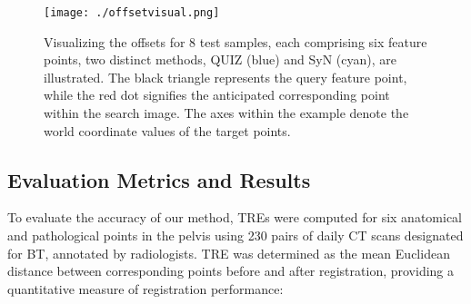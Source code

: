 \documentclass[preprint,review,12pt]{elsarticle}
\begin{document}
\begin{figure*}[!h]
    \centering
    \texttt{[image: ./offsetvisual.png]}
    \caption{Visualizing the offsets for 8 test samples, each comprising six feature points, two distinct methods, QUIZ (blue) and SyN (cyan), are illustrated. The black triangle represents the query feature point, while the red dot signifies the anticipated corresponding point within the search image. The axes within the example denote the world coordinate values of the target points.}
    \label{fig:plteps}
\end{figure*}

\begin{table*}
	\setlength{\abovecaptionskip}{0cm}  %
	\setlength{\belowcaptionskip}{0.2cm} %
	\centering
	\caption{Results for image registration across various cervical cancer exposure durations. Six expert-identified landmark pairs were employed to compute both the mean TRE in millimeters and the rTRE for each instance.}
	\label{table1}
\end{table*}


\subsection{Evaluation Metrics and Results }
To evaluate the accuracy of our method, TREs were computed for six anatomical and pathological points in the pelvis using 230 pairs of daily CT scans designated for BT, annotated by radiologists. TRE was determined as the mean Euclidean distance between corresponding points before and after registration, providing a quantitative measure of registration performance:
\end{document}
